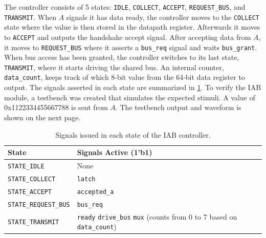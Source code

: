 \documentclass[../main.tex]{subfiles}
\begin{document}
The controller consists of 5 states: \texttt{IDLE}, \texttt{COLLECT}, \texttt{ACCEPT}, \texttt{REQUEST\_BUS}, and \texttt{TRANSMIT}. When $A$ signals it has data ready, the controller moves to the \texttt{COLLECT} state where the value is then stored in the datapath register. Afterwards it moves to \texttt{ACCEPT} and outputs the handshake accept signal. After accepting data from $A$, it moves to \texttt{REQUEST\_BUS} where it asserts a \texttt{bus\_req} signal and waits \texttt{bus\_grant}. When bus access has been granted, the controller switches to its last state, \texttt{TRANSMIT}, where it starts driving the shared bus. An internal counter, \texttt{data\_count}, keeps track of which 8-bit value from the 64-bit data register to output. The signals asserted in each state are summarized in \cref{tab:iab_controller_state_signals}. To verify the IAB module, a testbench was created that simulates the expected stimuli. A value of 0x1122334455667788 is sent from $A$. The testbench output and waveform is shown on the next page.

\newpage

\vspace{-10pt}
\begin{table}[h]
    \centering
    \renewcommand{\arraystretch}{1.5}
    \setlength{\tabcolsep}{6pt}

    \begin{tabularx}{\textwidth}{@{}l X@{}}
        \toprule
        \textbf{State} & \textbf{Signals Active (1'b1)} \\
        \midrule
        \texttt{STATE\_IDLE} & 
            None \\
        \hline
        \texttt{STATE\_COLLECT} & 
            \texttt{latch} \\
        \hline
        \texttt{STATE\_ACCEPT} & 
            \texttt{accepted\_a} \\
        \hline
        \texttt{STATE\_REQUEST\_BUS} & 
            \texttt{bus\_req} \\
        \hline
        \texttt{STATE\_TRANSMIT} & 
            \texttt{ready} \newline
            \texttt{drive\_bus} \newline
            \texttt{mux} (counts from 0 to 7 based on \texttt{data\_count}) \\
        \bottomrule
    \end{tabularx}

    \caption{Signals issued in each state of the IAB controller.}
    \label{tab:iab_controller_state_signals}
\end{table}
\end{document}
